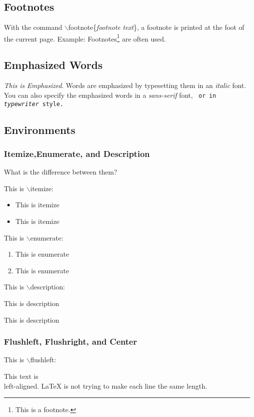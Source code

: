 \documentclass[11pt,a4paper]{article}
\begin{document}
\subsection{Footnotes}
With the command $\backslash$footnote\{\textit{footnote text}\}, a footnote is 
printed at the foot of the current page.
Example: Footnotes\footnote{This is a footnote.} are often used.
\subsection{Emphasized Words}
\emph{This is \emph{Emphasized}}. Words are emphasized by typesetting them in an
\textit{italic} font. You can also specify the emphasized words \textsf{in a 
\emph{sans-serif} font,} \texttt{ or in \emph{typewriter} style. }
\subsection{Environments}
\subsubsection{Itemize,Enumerate, and Description}
What is the difference between them?

This is $\backslash$itemize:\\
\begin{itemize}
    \item This is itemize
    \item This is itemize    
\end{itemize}
This is $\backslash$enumerate:\\
\begin{enumerate}
    \item This is enumerate
    \item This is enumerate
\end{enumerate}
This is $\backslash$description:
\begin{description}
    \item This is description
    \item This is description
\end{description}
\subsubsection{Flushleft, Flushright, and Center}
This is $\backslash$flushleft:
\begin{flushleft}
    This text is \\left-aligned. \LaTeX{} is not trying to make each line the same
    length.
\end{flushleft}
\end{document}
